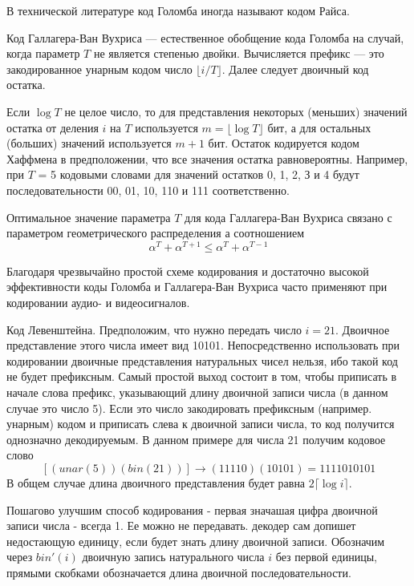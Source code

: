 \documentclass[14pt]{article}
\begin{document}
В технической литературе код Голомба иногда называют кодом Райса.

Код Галлагера-Ван Вухриса — естественное обобщение кода Голомба на случай, когда параметр \(T\) не является степенью двойки. Вычисляется префикс — это закодированное унарным кодом число \(\lfloor i/T \rfloor\). Далее следует двоичный код остатка.

Если \(\log T\) не целое число, то для представления некоторых (меньших) значений остатка от деления \(i\) на \(T\) используется \(m = \lfloor \log T \rfloor\) бит, а для остальных (больших) значений используется \(m + 1\) бит. Остаток кодируется кодом Хаффмена в предположении, что все значения остатка равновероятны. Например, при \(T\) = 5 кодовыми словами для значений остатков 0, 1, 2, З и 4 будут последовательности 00, 01, 10, 110 и 111 соответственно.

Оптимальное значение параметра \(T\) для кода Галлагера-Ван Вухриса связано с параметром геометрического распределения а соотношением
\begin{displaymath}
    \alpha^T + \alpha^{T+1} \leq \alpha^T + \alpha^{T-1}
\end{displaymath}

Благодаря чрезвычайно простой схеме кодирования и достаточно высокой эффективности коды Голомба и Галлагера-Ван Вухриса часто применяют при кодировании аудио- и видеосигналов.

Код Левенштейна. Предположим, что нужно передать число \(i = 21\). Двоичное представление этого числа имеет вид 10101. Непосредственно использовать при кодировании двоичные представления натуральных чисел нельзя, ибо такой код не будет префиксным. Самый простой выход состоит в том, чтобы приписать в начале слова префикс, указывающий длину двоичной записи числа (в данном случае это число 5). Если это число закодировать префиксным (например. унарным) кодом и приписать слева к двоичной записи числа, то код получится однозначно декодируемым. В данном примере для числа 21 получим кодовое слово \[[(unar(5))(bin(21))] \to (11110)(10101) = 1111010101\] В общем случае длина двоичного представления будет равна \(2 \lceil \log i\rceil\).

Пошагово улучшим способ кодирования - первая значашая цифра двоичной записи числа - всегда 1. Ее можно не передавать. декодер сам допишет недостающую единицу, если будет знать длину двоичной записи. Обозначим через \(bin'(i)\) двоичную запись натурального числа \(i\) без первой единицы, прямыми скобками обозначается длина двоичной последовательности.
\end{document}
